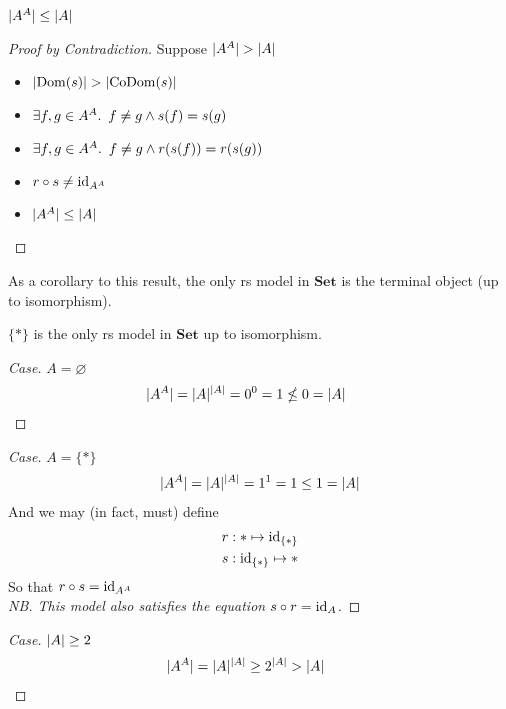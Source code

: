 \begin{prop}
  $\lvert A^A\rvert\leq\lvert A\rvert$

  \begin{proof}[Proof by Contradiction] Suppose $\lvert A^A\rvert > \lvert A\rvert$
    \begin{itemize}
      \item[\iffs] $\lvert\operatorname{Dom}(s)\rvert > \lvert\operatorname{CoDom}(s)\rvert$

      \item[\imps] $\exists f, g\in A^A\ldotp~ f\neq g\land s(f) = s(g)$

      \item[\imps] $\exists f, g\in A^A\ldotp~ f\neq g\land r(s(f)) = r(s(g))$

      \item[\imps] $r\circ s\neq\operatorname{id}_{A^A}$
      \item[\contras] $\lvert A^A\rvert\leq\lvert A\rvert$
        \qedhere
    \end{itemize}
  \end{proof}
\end{prop}

As a corollary to this result, the only rs model in $\mathbf{Set}$ is the terminal object (up to isomorphism).

\begin{prop}
  $\{\ast\}$ is the only rs model in $\mathbf{Set}$ up to isomorphism.
  \begin{proof}[Case]
    $A = \varnothing$
    \begin{align*}
      \lvert A^A\rvert = \lvert A\rvert^{\lvert A\rvert} = 0^0 = 1 \nleq 0 = \lvert A\rvert
      \tag*{\qedhere}
    \end{align*}
  \end{proof}

  \begin{proof}[Case]
    $A = \{\ast\}$
    \begin{align*}
      \lvert A^A\rvert = \lvert A\rvert^{\lvert A\rvert} = 1^1 = 1 \leq 1 = \lvert A\rvert
    \end{align*}
    And we may (in fact, must) define
    \begin{align*}
      r & : \ast \mapsto \operatorname{id}_{\{\ast\}}\\
      s & : \operatorname{id}_{\{\ast\}} \mapsto \ast
    \end{align*}
    So that $r\circ s = \operatorname{id}_{A^A}$\qedhere\\
    \noindent\textit{NB. This model also satisfies the equation $s\circ r = \operatorname{id}_A$.}
  \end{proof}
  \begin{proof}[Case]
    $\lvert A\rvert\geq 2$
    \begin{align*}
      \lvert A^A\rvert = \lvert A\rvert^{\lvert A\rvert} \geq 2^{\lvert A\rvert} > \lvert A\rvert
      \tag*{\qedhere}
    \end{align*}
  \end{proof}
\end{prop}

